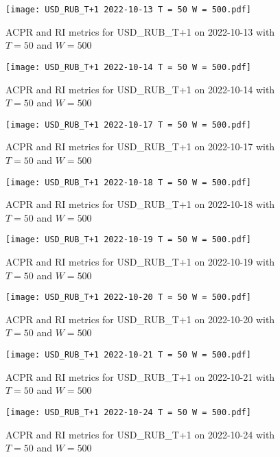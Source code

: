 \begin{figure}[htbp]
	\texttt{[image: USD\_RUB\_T+1 2022-10-13 T = 50 W = 500.pdf]}
	\caption{ACPR and RI metrics for USD\_RUB\_T+1 on 2022-10-13 with $T = 50$ and $W = 500$}
\end{figure}

\begin{figure}[htbp]
	\texttt{[image: USD\_RUB\_T+1 2022-10-14 T = 50 W = 500.pdf]}
	\caption{ACPR and RI metrics for USD\_RUB\_T+1 on 2022-10-14 with $T = 50$ and $W = 500$}
\end{figure}

\begin{figure}[htbp]
	\texttt{[image: USD\_RUB\_T+1 2022-10-17 T = 50 W = 500.pdf]}
	\caption{ACPR and RI metrics for USD\_RUB\_T+1 on 2022-10-17 with $T = 50$ and $W = 500$}
\end{figure}

\begin{figure}[htbp]
	\texttt{[image: USD\_RUB\_T+1 2022-10-18 T = 50 W = 500.pdf]}
	\caption{ACPR and RI metrics for USD\_RUB\_T+1 on 2022-10-18 with $T = 50$ and $W = 500$}
\end{figure}

\begin{figure}[htbp]
	\texttt{[image: USD\_RUB\_T+1 2022-10-19 T = 50 W = 500.pdf]}
	\caption{ACPR and RI metrics for USD\_RUB\_T+1 on 2022-10-19 with $T = 50$ and $W = 500$}
\end{figure}

\begin{figure}[htbp]
	\texttt{[image: USD\_RUB\_T+1 2022-10-20 T = 50 W = 500.pdf]}
	\caption{ACPR and RI metrics for USD\_RUB\_T+1 on 2022-10-20 with $T = 50$ and $W = 500$}
\end{figure}

\begin{figure}[htbp]
	\texttt{[image: USD\_RUB\_T+1 2022-10-21 T = 50 W = 500.pdf]}
	\caption{ACPR and RI metrics for USD\_RUB\_T+1 on 2022-10-21 with $T = 50$ and $W = 500$}
\end{figure}

\begin{figure}[htbp]
	\texttt{[image: USD\_RUB\_T+1 2022-10-24 T = 50 W = 500.pdf]}
	\caption{ACPR and RI metrics for USD\_RUB\_T+1 on 2022-10-24 with $T = 50$ and $W = 500$}
\end{figure}

